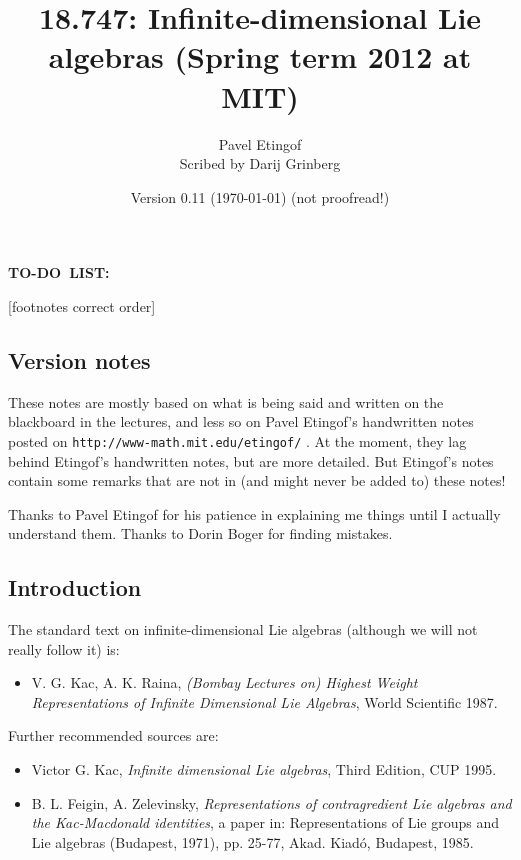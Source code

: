 \documentclass
[numbers=enddot,12pt,final,onecolumn,german,notitlepage]{scrartcl}%
\theoremstyle{definition}
\newenvironment{noncompile}{}{}
\begin{document}
\title{18.747: Infinite-dimensional Lie algebras (Spring term 2012 at MIT)}
\author{Pavel Etingof\\Scribed by Darij Grinberg}
\date{Version 0.11 (\today) (not proofread!)}
\maketitle
\tableofcontents

\begin{noncompile}
\textbf{TO-DO\ LIST:}

[footnotes correct order]
\end{noncompile}

\subsection{Version notes}

These notes are mostly based on what is being said and written on the
blackboard in the lectures, and less so on Pavel Etingof's handwritten notes
posted on \newline\texttt{http://www-math.mit.edu/etingof/} . At
the moment, they lag behind Etingof's handwritten notes, but are more
detailed. But Etingof's notes contain some remarks that are not in (and might
never be added to) these notes!

Thanks to Pavel Etingof for his patience in explaining me things until I
actually understand them. Thanks to Dorin Boger for finding mistakes.

\subsection{Introduction}

The standard text on infinite-dimensional Lie algebras (although we will not
really follow it) is:

\begin{itemize}
\item V. G. Kac, A. K. Raina, \textit{(Bombay Lectures on) Highest Weight
Representations of Infinite Dimensional Lie Algebras}, World Scientific 1987.
\end{itemize}

Further recommended sources are:

\begin{itemize}
\item Victor G. Kac, \textit{Infinite dimensional Lie algebras}, Third
Edition, CUP 1995.

\item B. L. Feigin, A. Zelevinsky, \textit{Representations of contragredient
Lie algebras and the Kac-Macdonald identities}, a paper in: Representations of
Lie groups and Lie algebras (Budapest, 1971), pp. 25-77, Akad. Kiad\'{o},
Budapest, 1985.
\end{itemize}
\end{document}
